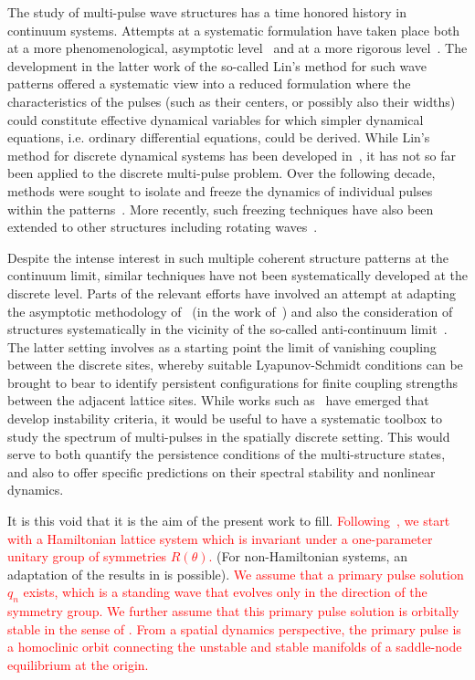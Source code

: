 \documentclass[12pt]{elsarticle}
\newcommand{\revised}[1]{ \textcolor{red}{#1} }
\begin{document}
The study of multi-pulse wave structures has a time honored history in continuum systems. Attempts at a systematic formulation have taken place both at a more phenomenological, asymptotic level~\cite{elphick} and at a more rigorous level~\cite{Sandstede1998}. The development in the latter work of the so-called Lin's method for such wave patterns offered a systematic view into a reduced formulation where the characteristics of the pulses (such as their centers, or possibly also their widths) could constitute effective
dynamical variables for which simpler dynamical equations, i.e. ordinary differential equations, could be derived. While Lin's method for discrete dynamical systems has been developed in~\cite{Knobloch2000}, it has not so far been applied to the discrete multi-pulse problem. Over the following decade, methods were sought to 
isolate and freeze the dynamics of individual pulses within the patterns~\cite{beyn1,beyn2}. More recently, such freezing techniques have also been extended to other structures including rotating waves~\cite{beyn3}. 

Despite the intense interest in such multiple coherent structure patterns at the continuum limit, similar techniques have not been systematically developed at the discrete level. Parts of the relevant efforts have involved an attempt at adapting the asymptotic methodology of~\cite{elphick} (in the work of~\cite{kevold}) and also the consideration of structures systematically in the vicinity of the so-called anti-continuum limit~\cite{Pelinovsky2005}.
The latter setting involves as a starting point the limit of vanishing coupling between the discrete sites, whereby suitable Lyapunov-Schmidt conditions can be brought to bear to identify persistent configurations for finite coupling strengths between the adjacent lattice sites. While works such as~\cite{Kapitula2001a}
have emerged that develop instability criteria, it would be useful to have a systematic toolbox to study the spectrum of multi-pulses in the spatially discrete setting. This would serve to both quantify the persistence conditions of the multi-structure states, and also to offer specific predictions on their spectral stability and nonlinear dynamics. 

It is this void that it is the aim of the present work to fill. \revised{Following~\cite{Grillakis1987}, we start with a Hamiltonian lattice system which is invariant under a one-parameter unitary group of symmetries $R(\theta)$.} (For non-Hamiltonian systems, an adaptation of the results in \cite{Sandstede1998} is possible). \revised{We assume that a primary pulse solution $q_n$ exists, which is a standing wave that evolves only in the direction of the symmetry group. We further assume that this primary pulse solution is orbitally stable in the sense of \cite{Grillakis1987}. From a spatial dynamics perspective, the primary pulse is a homoclinic orbit connecting the unstable and stable manifolds of a saddle-node equilibrium at the origin.}
\end{document}
